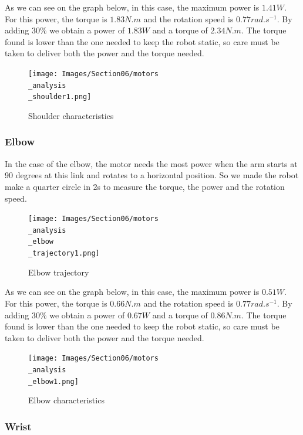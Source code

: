 \bigbreak
As we can see on the graph below, in this case, the maximum power is $1.41W$. For this power, the torque is $1.83N.m$ and the rotation speed is $0.77rad.s^{-1}$. By adding 30\% we obtain a power of $1.83W$ and a torque of $2.34N.m$. The torque found is lower than the one needed to keep the robot static, so care must be taken to deliver both the power and the torque needed.
\begin{figure}[ht]
    \centering
    \texttt{[image: Images/Section06/motors\\\_analysis\\\_shoulder1.png]}
    \caption{Shoulder characteristics}
    \label{fig:ShoulderCharacteristics}
\end{figure}
\FloatBarrier

\subsubsection{Elbow}

In the case of the elbow, the motor needs the most power when the arm starts at 90 degrees at this link and rotates to a horizontal position. So we made the robot make a quarter circle in 2s to measure the torque, the power and the rotation speed.

\begin{figure}[ht]
    \centering
    \texttt{[image: Images/Section06/motors\\\_analysis\\\_elbow\\\_trajectory1.png]}
    \caption{Elbow trajectory}
    \label{fig:ElbowTrajectory}
\end{figure}
\FloatBarrier

As we can see on the graph below, in this case, the maximum power is $0.51W$. For this power, the torque is $0.66N.m$ and the rotation speed is $0.77rad.s^{-1}$. By adding 30\% we obtain a power of $0.67W$ and a torque of $0.86N.m$. The torque found is lower than the one needed to keep the robot static, so care must be taken to deliver both the power and the torque needed.
\begin{figure}[ht]
    \centering
    \texttt{[image: Images/Section06/motors\\\_analysis\\\_elbow1.png]}
    \caption{Elbow characteristics}
    \label{fig:ElbowCharacteristics}
\end{figure}
\FloatBarrier

\subsubsection{Wrist}

